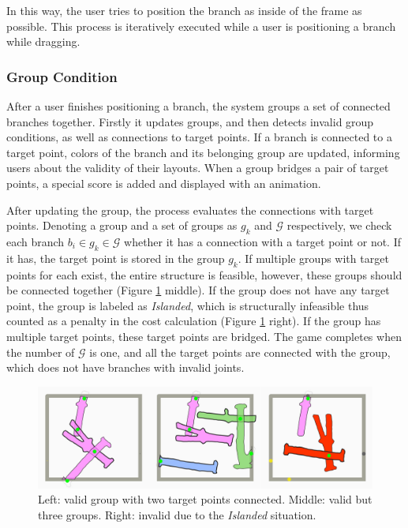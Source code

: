 In this way, the user tries to position the branch as inside of the frame as possible.
This process is iteratively executed while a user is positioning a branch while dragging.

\subsubsection{Group Condition}

After a user finishes positioning a branch, the system groups a set of connected branches together.
Firstly it updates groups, and then detects invalid group conditions, as well as connections to target points.
If a branch is connected to a target point, colors of the branch and its belonging group are updated, informing users about the validity of their layouts.
When a group bridges a pair of target points, a special score is added and displayed with an animation.

After updating the group, the process evaluates the connections with target points.
Denoting a group and a set of groups as $g_k$ and $\mathcal{G}$ respectively, we check each branch $b_i \in g_k \in \mathcal{G}$ whether it has a connection with a target point or not. If it has, the target point is stored in the group $g_k$.
If multiple groups with target points for each exist, the entire structure is feasible, however, these groups should be connected together (Figure \ref{fig:group} middle).
If the group does not have any target point, the group is labeled as \textit{Islanded}, which is structurally infeasible thus counted as a penalty in the cost calculation (Figure \ref{fig:group} right).
If the group has multiple target points, these target points are bridged.
The game completes when the number of $\mathcal{G}$ is one, and all the target points are connected with the group, which does not have branches with invalid joints.

\begin{figure}[ht]
  \begin{center}
    \includegraphics[width = 0.4\paperwidth]{images/interface/groups.jpg}
    \caption{Left: valid group with two target points connected. Middle: valid but three groups. Right: invalid due to the \textit{Islanded} situation. }
    \label{fig:group}
  \end{center}
\end{figure}

